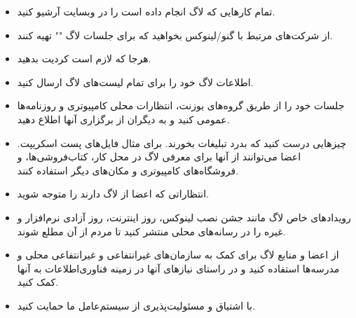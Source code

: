 \begin{itemize}
\item
تمام کارهایی که لاگ انجام داده است را در وبسایت آرشیو کنید.
\item
از شرکت‌های مرتبط با گنو/لینوکس بخواهید که برای جلسات لاگ
""
تهیه کنند.
\item
هرجا که لازم است کردیت بدهید.
\item
اطلاعات لاگ خود را برای تمام لیست‌های لاگ ارسال کنید.
\item
جلسات‌ خود را از طریق گروه‌های یوزنت، انتظارات محلی کامپیوتری و روزنامه‌ها
عمومی کنید و به دیگران از برگزاری آنها اطلاع دهید.
\item
چیزهایی درست کنید که بدرد تبلیغات بخورند. برای مثال فایل‌های پست اسکریپت.
اعضا می‌توانند از آنها برای معرفی لاگ در محل کار، کتاب‌فروشی‌ها، و فروشگاه‌های کامپیوتری
و مکان‌های دیگر استفاده کنند.
\item
انتظاراتی که اعضا از لاگ دارند را متوجه شوید.
\item
رویدادهای خاص لاگ مانند جشن نصب لینوکس، روز اینترنت، روز آزادی نرم‌افزار
و غیره را در رسانه‌های محلی منتشر کنید تا مردم از آن مطلع شوند.
\item
از اعضا و منابع لاگ برای کمک به سازمان‌های غیرانتفاعی و غیرانتفاعی محلی
و مدرسه‌ها استفاده کنید و در راستای نیازهای آنها در زمینه فناوری‌اطلاعات
به آنها کمک کنید.
\item
با اشتیاق و مسئولیت‌پذیری از سیستم‌عامل ما حمایت کنید.

\end{itemize}
